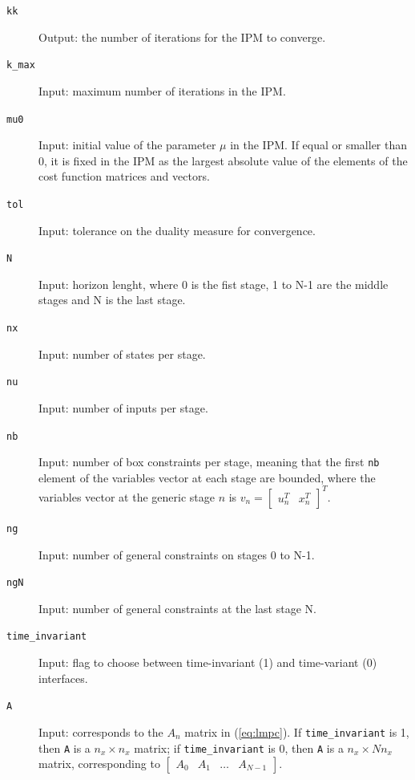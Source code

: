 \documentclass[a4paper]{report}
\begin{document}
\begin{description}

\item[\tt kk] Output: the number of iterations for the IPM to converge.

\item[\tt k\_max] Input: maximum number of iterations in the IPM.

\item[\tt mu0] Input: initial value of the parameter $\mu$ in the IPM.
If equal or smaller than 0, it is fixed in the IPM as the largest absolute value of the elements of the cost function matrices and vectors.

\item[\tt tol] Input: tolerance on the duality measure for convergence.

\item[\tt N] Input: horizon lenght, where 0 is the fist stage, 1 to N-1 are the middle stages and N is the last stage.

\item[\tt nx] Input: number of states per stage.

\item[\tt nu] Input: number of inputs per stage.

\item[\tt nb] Input: number of box constraints per stage, meaning that the first {\tt nb} element of the variables vector at each stage are bounded, where the variables vector at the generic stage $n$ is $v_n = \begin{bmatrix} u_n^T & x_n^T \end{bmatrix}^T$.

\item[\tt ng] Input: number of general constraints on stages 0 to N-1.

\item[\tt ngN] Input: number of general constraints at the last stage N.

\item[\tt time\_invariant] Input: flag to choose between time-invariant (1) and time-variant (0) interfaces.

\item[\tt A] Input: corresponds to the $A_n$ matrix in (\ref{eq:lmpc}).
If {\tt time\_invariant} is 1, then {\tt A} is a $n_x\times n_x$ matrix; if {\tt time\_invariant} is 0, then {\tt A} is a $n_x\times Nn_x$ matrix, corresponding to $\begin{bmatrix} A_0 & A_1 & \dots & A_{N-1} \end{bmatrix}$.


\end{description}
\end{document}
